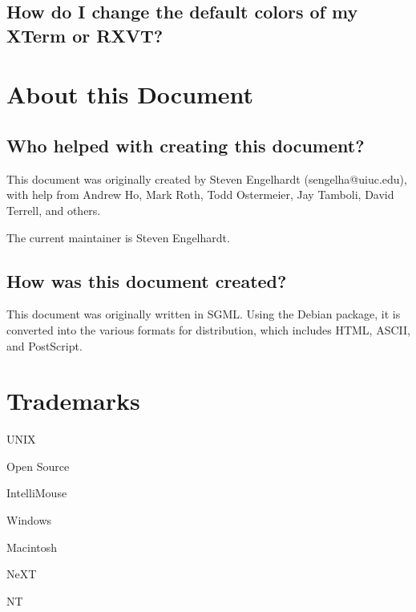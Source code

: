 \documentclass[a4paper]{article}
\begin{document}
\subsection{How do I change the default colors of my XTerm or RXVT?}






\section{About this Document}


\subsection{Who helped with creating this document?}

This document was originally created by Steven Engelhardt (sengelha@uiuc.edu),
with help from Andrew Ho, Mark Roth, Todd Ostermeier, Jay Tamboli, David
Terrell, and others.

The current maintainer is Steven Engelhardt.




\subsection{How was this document created?}

This document was originally written in SGML.  Using the Debian  package, it is
converted into the various formats for distribution, which includes
HTML, ASCII, and PostScript.




\section{Trademarks}

UNIX

Open Source

IntelliMouse

Windows

Macintosh

NeXT

NT
\end{document}
